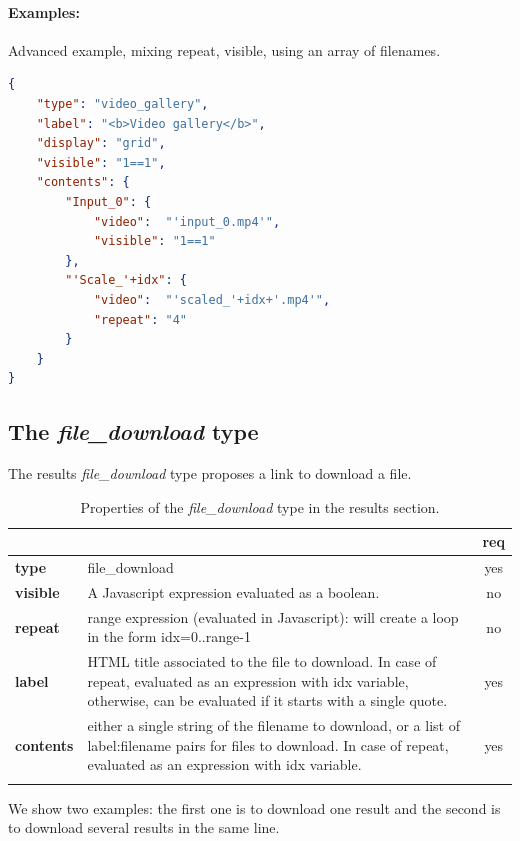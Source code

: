 \paragraph{Examples:}
Advanced example, mixing repeat, visible, using an array of filenames.
\begin{lstlisting}[language=json,firstnumber=1]
{
    "type": "video_gallery",
    "label": "<b>Video gallery</b>",
    "display": "grid",
    "visible": "1==1",
    "contents": {
        "Input_0": {
            "video":  "'input_0.mp4'",
            "visible": "1==1"
        },
        "'Scale_'+idx": {
            "video":  "'scaled_'+idx+'.mp4'",
            "repeat": "4"
        }
    }
}
\end{lstlisting}



\subsection{The \emph{file\_download} type}

The results \emph{file\_download} type proposes a link to download a file.

\begin{longtable}{|>{\bf}L{\linewidth}|L{\linewidth}|c|}
\hline
{}     &  & {\bf req} \tabularnewline 
\hline \hline
 type      & file\_download  & yes \\ \hline
 visible    & A Javascript expression evaluated as a boolean. & no \\ \hline
 repeat    & range expression (evaluated in Javascript):
              will create a loop in the form idx=0..range-1 & no \\ \hline
 label     & HTML title associated to the file to download. In case of repeat, 
            evaluated as an expression with idx variable, otherwise, can be evaluated
            if it starts with a single quote.& yes \\ \hline
 contents  & either a single string of the filename to download, or a list
              of label:filename pairs for files to download. In case of repeat, 
            evaluated as an expression with idx variable. & yes \\ \hline
\caption{Properties of the \emph{file\_download} type in the results section.}
\end{longtable}

We show two examples: the first one is to download one result and the second is to download several results in the same line.

